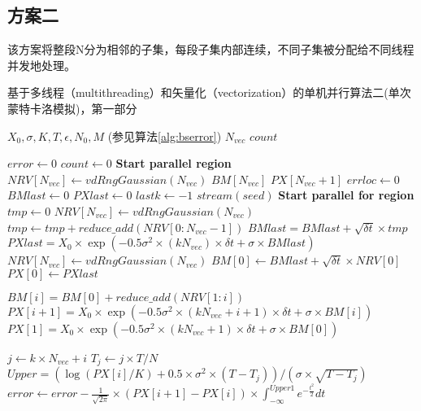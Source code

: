 \subsection{方案二}
该方案将整段N分为相邻的子集，每段子集内部连续，不同子集被分配给不同线程并发地处理。
\begin{algorithm}
  \caption{基于多线程（multithreading）和矢量化（vectorization）的单机并行算法二(单次蒙特卡洛模拟)，第一部分}
  \label{alg:omp2_1}
  \begin{algorithmic}[1]
    \Require $X_0, \sigma, K, T, \epsilon, N_0, M$ (参见算法\ref{alg:bserror})
    \Require $N_{vec}$ 
    \Ensure $count$

    \State $error \gets 0$
    \State $count \gets 0$
    \State \textbf{Start parallel region} 
    \State $NRV[N_{vec}] \gets vdRngGaussian(N_{vec})$  
    \State $BM[N_{vec}]$ 
    \State $PX[N_{vec}+1]$ 
    \State $errloc \gets 0$ 
    \State $BMlast \gets 0$ 
    \State $PXlast \gets 0$ 
    \State $lastk \gets -1$ 
    \State $stream(seed)$ 
    \State \textbf{Start parallel for region} 
    \State $tmp \gets 0$
    \State $NRV[N_{vec}] \gets vdRngGaussian(N_{vec})$ 
    \State $tmp \gets tmp + reduce\_add(NRV[0:N_{vec}-1])$ 
    \EndFor
    \State $BMlast = BMlast + \sqrt{\delta t}\times tmp$
    \State $PXlast = X_0 \times \exp(-0.5 \sigma^2 \times (kN_{vec}) \times \delta t + \sigma \times BMlast)$
    \State $NRV[N_{vec}] \gets vdRngGaussian(N_{vec})$ 
    \State $BM[0] \gets BMlast + \sqrt{\delta t}\times NRV[0]$
    \State $PX[0] \gets PXlast$

    \State $BM[i] = BM[0] + reduce\_add(NRV[1:i])$ 
    \State $PX[i+1] = X_0 \times \exp(-0.5 \sigma^2 \times (kN_{vec}+i+1) \times \delta t + \sigma \times BM[i])$
    \EndFor
    \State $PX[1] = X_0 \times \exp(-0.5 \sigma^2 \times (kN_{vec}+1) \times \delta t + \sigma \times BM[0])$

    \State $j \gets k\times N_{vec}+i$
    \State $T_j \gets j\times T/N$
    \State $Upper = (\log(PX[i]/K)+0.5\times \sigma^2 \times (T-T_j))/(\sigma \times \sqrt{T-T_j})$
    \State $error \gets error - \frac{1}{\sqrt{2\pi}}\times (PX[i+1]-PX[i])\times \int_{-\infty}^{Upper1}e^{-\frac{t^2}{2}}dt$
    \EndFor
    

\end{algorithmic}
\end{algorithm}
